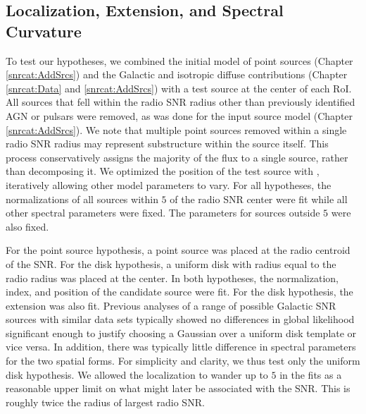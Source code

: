 \subsection{Localization, Extension, and Spectral Curvature}\label{snrcat:LocExtSpec}

To test our hypotheses, we combined the initial model of point sources (Chapter \ref{snrcat:AddSrcs}) and the Galactic and isotropic diffuse contributions (Chapter \ref{snrcat:Data} and \ref{snrcat:AddSrcs}) with a test source at the center of each RoI. All sources that fell within the radio SNR radius other than previously identified AGN or pulsars were removed, as was done for the input source model (Chapter \ref{snrcat:AddSrcs}). We note that multiple point sources removed within a single radio SNR radius may represent substructure within the source itself. This process conservatively assigns the majority of the flux to a single source, rather than decomposing it. We optimized the position of the test source with \ptlike{}, iteratively allowing other model parameters to vary. For all hypotheses, the normalizations of all sources within $5$\degr{} of the radio SNR center were fit while all other spectral parameters were fixed. The parameters for sources outside $5$\degr{} were also fixed.

For the point source hypothesis, a point source was placed at the radio centroid of the SNR. For the disk hypothesis, a uniform disk with radius equal to the radio radius was placed at the center. In both hypotheses, the normalization, index, and position of the candidate source were fit. For the disk hypothesis, the extension was also fit. Previous analyses of a range of possible Galactic SNR sources with similar data sets \citep[e.g.][]{Lande12} typically showed no differences in global likelihood significant enough to justify choosing a Gaussian over a uniform disk template or vice versa. In addition, there was typically little difference in spectral parameters for the two spatial forms. For simplicity and clarity, we thus test only the uniform disk hypothesis. We allowed the localization to wander up to  $5$\degr{} in the fits as a reasonable upper limit on what might later be associated with the SNR. This is roughly twice the radius of largest radio SNR.

